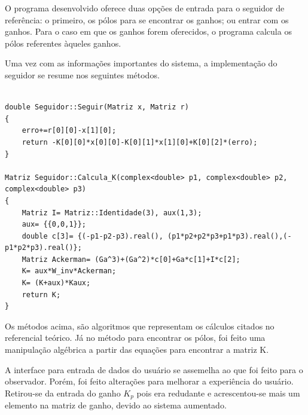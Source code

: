 \documentclass[a4paper,12pt]{article}
\begin{document}
O programa desenvolvido oferece duas opções de entrada para o seguidor de referência: o primeiro, os pólos para se encontrar os ganhos; ou entrar com os ganhos. Para o caso em que os ganhos forem oferecidos, o programa calcula os pólos referentes àqueles ganhos.

\hspace{4ex}Uma vez com as informações importantes do sistema, a implementação do seguidor se resume nos seguintes métodos.

\begin{lstlisting}

double Seguidor::Seguir(Matriz x, Matriz r)
{
    erro+=r[0][0]-x[1][0];
    return -K[0][0]*x[0][0]-K[0][1]*x[1][0]+K[0][2]*(erro);
}

Matriz Seguidor::Calcula_K(complex<double> p1, complex<double> p2, complex<double> p3)
{
    Matriz I= Matriz::Identidade(3), aux(1,3);
    aux= {{0,0,1}};
    double c[3]= {(-p1-p2-p3).real(), (p1*p2+p2*p3+p1*p3).real(),(-p1*p2*p3).real()};
    Matriz Ackerman= (Ga^3)+(Ga^2)*c[0]+Ga*c[1]+I*c[2];
    K= aux*W_inv*Ackerman;
    K= (K+aux)*Kaux;
    return K;
}

\end{lstlisting}

\hspace{4ex}Os métodos acima, são algoritmos que representam os cálculos citados no referencial teórico. Já no método para encontrar os pólos, foi feito uma manipulação algébrica a partir das equações para encontrar a matriz K.

\hspace{4ex}A interface para entrada de dados do usuário se assemelha ao que foi feito para o observador. Porém, foi feito alterações para melhorar a experiência do usuário. Retirou-se da entrada do ganho $K_p$ pois era redudante e acrescentou-se mais um elemento na matriz de ganho, devido ao sistema aumentado. 
\end{document}
